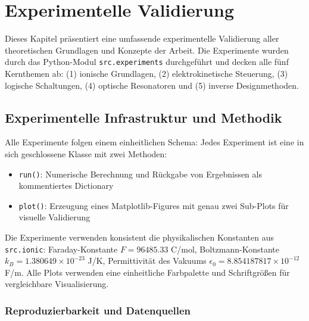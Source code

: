 ﻿\documentclass[a4paper,12pt]{scrreprt}
\theoremstyle{definition}
\begin{document}

\section{Experimentelle Validierung}

Dieses Kapitel präsentiert eine umfassende experimentelle Validierung aller theoretischen Grundlagen und Konzepte der Arbeit. Die Experimente wurden durch das Python-Modul \texttt{src.experiments} durchgeführt und decken alle fünf Kernthemen ab: (1) ionische Grundlagen, (2) elektrokinetische Steuerung, (3) logische Schaltungen, (4) optische Resonatoren und (5) inverse Designmethoden.

\subsection{Experimentelle Infrastruktur und Methodik}

Alle Experimente folgen einem einheitlichen Schema: Jedes Experiment ist eine in sich geschlossene Klasse mit zwei Methoden:
\begin{itemize}
	\item \texttt{run()}: Numerische Berechnung und Rückgabe von Ergebnissen als kommentiertes Dictionary
	\item \texttt{plot()}: Erzeugung eines Matplotlib-Figures mit genau zwei Sub-Plots für visuelle Validierung
\end{itemize}

Die Experimente verwenden konsistent die physikalischen Konstanten aus \texttt{src.ionic}: Faraday-Konstante $F = 96485.33$ C/mol, Boltzmann-Konstante $k_B = 1.380649 \times 10^{-23}$ J/K, Permittivität des Vakuums $\epsilon_0 = 8.854187817 \times 10^{-12}$ F/m. Alle Plots verwenden eine einheitliche Farbpalette und Schriftgrößen für vergleichbare Visualisierung.

\subsubsection{Reproduzierbarkeit und Datenquellen}
\end{document}
